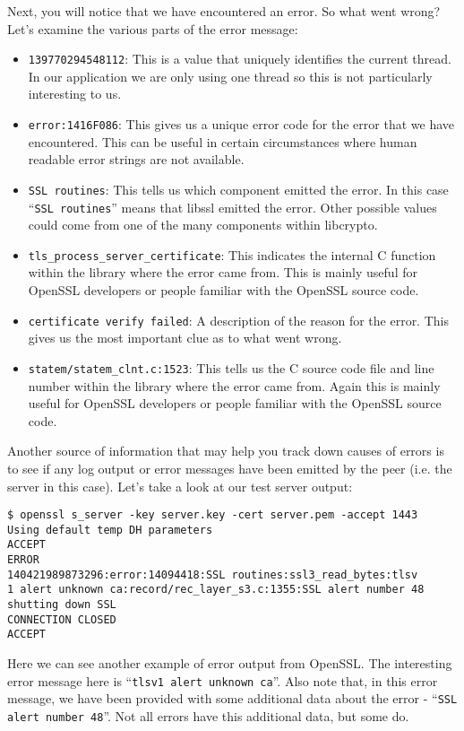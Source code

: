 Next, you will notice that we have encountered an error. So what went wrong? 
Let's examine the various parts of the error message:
\begin{itemize}
\item \texttt{139770294548112}: This is a value that uniquely identifies the
current thread. In our application we are only using one thread so this is not 
particularly interesting to us.
\item \texttt{error:1416F086}: This gives us a unique error code for the error
that we have encountered. This can be useful in certain circumstances where
human readable error strings are not available.
\item \texttt{SSL routines}: This tells us which component emitted the error. In
this case ``\texttt{SSL routines}'' means that libssl emitted the error. Other
possible values could come from one of the many components within libcrypto.
\item \texttt{tls\_process\_server\_certificate}: This indicates the internal C
function within the library where the error came from. This is mainly useful for
OpenSSL developers or people familiar with the OpenSSL source code.
\item \texttt{certificate verify failed}: A description of the reason for the
error. This gives us the most important clue as to what went wrong.
\item \texttt{statem/statem\_clnt.c:1523}: This tells us the C source code file 
and line number within the library where the error came from. Again this is
mainly  useful for OpenSSL developers or people familiar with the OpenSSL
source code.
\end{itemize}

Another source of information that may help you track down causes of errors is 
to see if any log output or error messages have been emitted by the peer (i.e. 
the server in this case). Let's take a look at our test server output:

\begin{verbatim}
$ openssl s_server -key server.key -cert server.pem -accept 1443
Using default temp DH parameters
ACCEPT
ERROR
140421989873296:error:14094418:SSL routines:ssl3_read_bytes:tlsv
1 alert unknown ca:record/rec_layer_s3.c:1355:SSL alert number 48
shutting down SSL
CONNECTION CLOSED
ACCEPT
\end{verbatim}

Here we can see another example of error output from OpenSSL. The interesting 
error message here is ``\verb!tlsv1 alert unknown ca!''. Also note that, in 
this error message, we have been provided with some additional data about the 
error - ``\verb!SSL alert number 48!''. Not all errors have this additional 
data, but some do.

